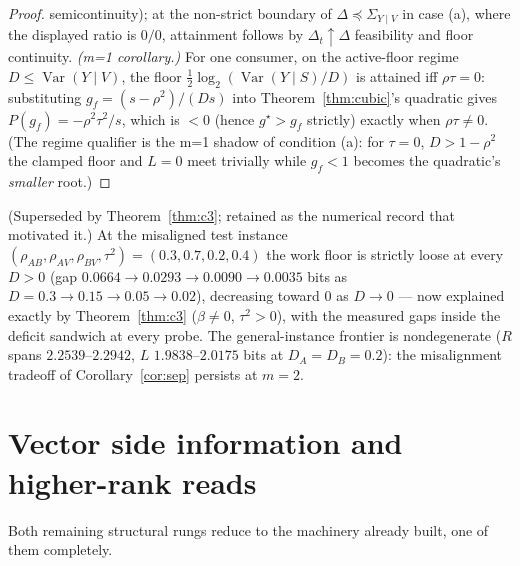 \documentclass[11pt]{article}
\begin{document}
\begin{proof}
semicontinuity); at the non-strict boundary of
$\Delta\preceq\Sigma_{Y\mid V}$ in case (a), where the displayed ratio is
$0/0$, attainment follows by $\Delta_t\uparrow\Delta$ feasibility and
floor continuity. \emph{(m=1 corollary.)} For one consumer, on the
active-floor regime $D\le\operatorname{Var}(Y\mid V)$, the floor
$\tfrac12\log_2(\operatorname{Var}(Y\mid S)/D)$ is attained iff
$\rho\tau=0$: substituting $g_f=(s-\rho^2)/(Ds)$ into
Theorem~\ref{thm:cubic}'s quadratic gives $P(g_f)=-\rho^2\tau^2/s$, which
is $<0$ (hence $g^\star>g_f$ strictly) exactly when $\rho\tau\ne0$. (The
regime qualifier is the m=1 shadow of condition (a): for $\tau=0$,
$D>1-\rho^2$ the clamped floor and $L=0$ meet trivially while $g_f<1$
becomes the quadratic's \emph{smaller} root.)
\end{proof}

\begin{remark}
\label{rem:c3}
(Superseded by Theorem~\ref{thm:c3}; retained as the numerical record
that motivated it.) At the misaligned test instance
$(\rho_{AB},\rho_{AV},\rho_{BV},\tau^2)=(0.3,0.7,0.2,0.4)$ the work floor
is strictly loose at every $D>0$
(gap $0.0664\to0.0293\to0.0090\to0.0035$ bits as
$D=0.3\to0.15\to0.05\to0.02$), decreasing toward $0$ as $D\to0$ --- now
explained exactly by Theorem~\ref{thm:c3} ($\beta\ne0$, $\tau^2>0$), with
the measured gaps inside the deficit sandwich at every probe. The
general-instance frontier is nondegenerate ($R$ spans $2.2539$--$2.2942$,
$L$ $1.9838$--$2.0175$ bits at $D_A=D_B=0.2$): the misalignment tradeoff
of Corollary~\ref{cor:sep} persists at $m=2$.
\end{remark}

\section{Vector side information and higher-rank reads}\label{sec:rungs}

Both remaining structural rungs reduce to the machinery already built,
one of them completely.
\end{document}
